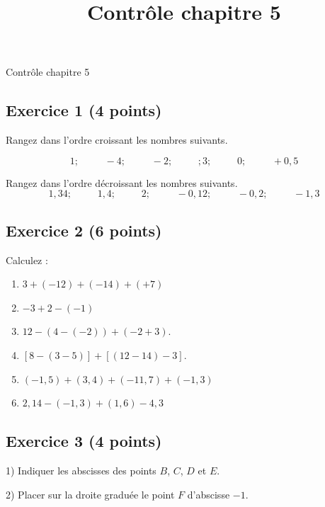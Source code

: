 \documentclass[14pt]{extreport}
\title{Contrôle chapitre 5}
\date{}
\theoremstyle{plain}
\begin{document}
\begin{center}{\Large Contrôle chapitre 5}\end{center}



\subsection*{Exercice 1 (4 points)}
 
 Rangez dans l'ordre croissant les nombres suivants. 
 
 \[1; \phantom{meow} -4;\phantom{meow} -2;\phantom{meow}; 3; \phantom{meow} 0; \phantom{meow} +0,5\]

 Rangez dans l'ordre décroissant les nombres suivants. 
\[ 1,34 ;\phantom{meow} 1,4 ;\phantom{meow} 2;\phantom{meow} -0,12;\phantom{meow} -0,2 ;\phantom{meow} -1,3\]
 
 
 
\subsection*{Exercice 2 (6 points)}
 
 Calculez : \begin{enumerate}
 \item $3 + (-12) + (-14) + (+7) $
 \item $-3 + 2 - (-1)$
 \item $ 12 - (4 - (-2)) + (-2 + 3)$.
 \item $ [ 8 - (3 - 5)] + [(12-14) -3]$.
 \item $ (-1,5) + (3,4)  + (-11,7) + (-1,3)$
 \item $ 2,14 - (-1,3) + (1,6) - 4,3$
 \end{enumerate}


\subsection*{Exercice 3 (4 points)} 
 
1) Indiquer les abscisses des points $B$, $C$, $D$ et $E$.
 
2) Placer sur la droite graduée le point $F$ d'abscisse $-1$. 
\end{document}
